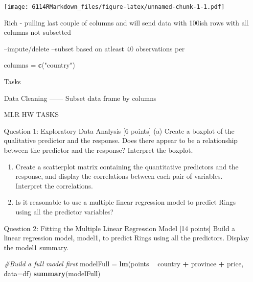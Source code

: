 \documentclass[]{article}
\newenvironment{Shaded}{\begin{snugshade}}{\end{snugshade}}
\newcommand{\CommentTok}[1]{\textcolor[rgb]{0.56,0.35,0.01}{\textit{#1}}}
\newcommand{\DataTypeTok}[1]{\textcolor[rgb]{0.13,0.29,0.53}{#1}}
\newcommand{\KeywordTok}[1]{\textcolor[rgb]{0.13,0.29,0.53}{\textbf{#1}}}
\newcommand{\NormalTok}[1]{#1}
\newcommand{\OperatorTok}[1]{\textcolor[rgb]{0.81,0.36,0.00}{\textbf{#1}}}
\newcommand{\StringTok}[1]{\textcolor[rgb]{0.31,0.60,0.02}{#1}}
\begin{document}
\texttt{[image: 6114RMarkdown\_files/figure-latex/unnamed-chunk-1-1.pdf]}

Rich - pulling last couple of columns and will send data with 100ish
rows with all columns not subsetted

--impute/delete --subset based on atleast 40 observations per

\begin{Shaded}
\begin{Highlighting}[]
\NormalTok{columns =}\StringTok{ }\KeywordTok{c}\NormalTok{(}\StringTok{"country"}\NormalTok{)}
\end{Highlighting}
\end{Shaded}

Tasks

Data Cleaning ------ Subset data frame by columns

MLR HW TASKS

Question 1: Exploratory Data Analysis {[}6 points{]} (a) Create a
boxplot of the qualitative predictor and the response. Does there appear
to be a relationship between the predictor and the response? Interpret
the boxplot.

\begin{enumerate}
\def\labelenumi{(\alph{enumi})}
\setcounter{enumi}{1}
\item
  Create a scatterplot matrix containing the quantitative predictors and
  the response, and display the correlations between each pair of
  variables. Interpret the correlations.
\item
  Is it reasonable to use a multiple linear regression model to predict
  Rings using all the predictor variables?
\end{enumerate}

Question 2: Fitting the Multiple Linear Regression Model {[}14 points{]}
Build a linear regression model, model1, to predict Rings using all the
predictors. Display the model1 summary.

\begin{Shaded}
\begin{Highlighting}[]
\CommentTok{#Build a full model first}
\NormalTok{modelFull =}\StringTok{ }\KeywordTok{lm}\NormalTok{(points }\OperatorTok{~}\StringTok{ }\NormalTok{country }\OperatorTok{+}\StringTok{ }\NormalTok{province }\OperatorTok{+}\StringTok{ }\NormalTok{price, }\DataTypeTok{data=}\NormalTok{df)}
\KeywordTok{summary}\NormalTok{(modelFull)}
\end{Highlighting}
\end{Shaded}
\end{document}
